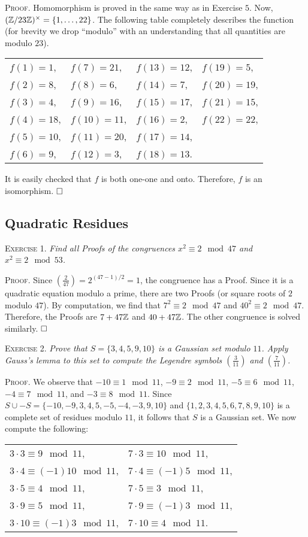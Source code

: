 \documentclass[11pt, leqno]{article}
\newcommand{\done}{\ensuremath{\hfill\square}}
\begin{document}
\textsc{Proof}. Homomorphism is proved in the same way as in Exercise $5$. Now, $(\mathbb{Z}/23\mathbb{Z})^{\times} = \{1, \ldots, 22\}$. The following table completely describes the function (for brevity we drop ``modulo'' with an understanding that all quantities are modulo $23$).
\begin{longtable}{p{6em} p{6em} p{6em} p{6em}}
  $f(1) = 1$, & $f(7) = 21$, & $f(13) = 12$, & $f(19) = 5$,\\
  $f(2) = 8$, & $f(8) = 6$, & $f(14) = 7$, & $f(20) = 19$,\\
  $f(3) = 4$, & $f(9) = 16$, & $f(15) = 17$, & $f(21) = 15$,\\
  $f(4) = 18$, & $f(10) = 11$, & $f(16) = 2$, & $f(22) = 22$,\\
  $f(5) = 10$, & $f(11) = 20$, & $f(17) = 14$, & \\
  $f(6) = 9$, & $f(12) = 3$, & $f(18) = 13$. & 
\end{longtable}
\reduce
It is easily checked that $f$ is both one-one and onto. Therefore, $f$ is an isomorphism. \done

\subsection{Quadratic Residues}

\textsc{Exercise 1}. \emph{Find all Proofs of the congruences $x^2 \equiv 2 \mod 47$ and $x^2 \equiv 2 \mod 53$.}

\textsc{Proof}. Since $\left( \frac{2}{47} \right) = 2^{(47-1)/2} = 1$, the congruence has a Proof. Since it is a quadratic equation modulo a prime, there are two Proofs (or square roots of $2$ modulo $47$). By computation, we find that $7^2 \equiv 2 \mod 47$ and $40^2 \equiv 2 \mod 47$. Therefore, the Proofs are $7+47\mathbb{Z}$ and $40+47\mathbb{Z}$. The other congruence is solved similarly. \done

\textsc{Exercise 2}. \emph{Prove that $S=\{3, 4, 5, 9, 10\}$ is a Gaussian set modulo $11$. Apply Gauss's lemma to this set to compute the Legendre symbols $\left(\frac{3}{11}\right)$ and $\left(\frac{7}{11}\right)$.}

\textsc{Proof}. We observe that $-10 \equiv 1 \mod 11$, $-9 \equiv 2 \mod 11$, $-5 \equiv 6 \mod 11$, $-4 \equiv 7 \mod 11$, and $-3 \equiv 8 \mod 11$. Since $S\cup -S = \{-10, -9, 3, 4, 5, -5, -4, -3, 9, 10\}$ and $\{1, 2, 3, 4, 5, 6, 7, 8, 9, 10\}$ is a complete set of residues modulo $11$, it follows that $S$ is a Gaussian set. We now compute the following:
\begin{longtable}{p{12em} p{12em}}
  $3 \cdot 3 \equiv 9 \mod 11$, & $7 \cdot 3 \equiv 10 \mod 11$,\\
  $3 \cdot 4 \equiv (-1)10 \mod 11$, & $7 \cdot 4 \equiv (-1)5 \mod 11$,\\
  $3 \cdot 5 \equiv 4 \mod 11$, & $7 \cdot 5 \equiv 3 \mod 11$,\\
  $3 \cdot 9 \equiv 5 \mod 11$, & $7 \cdot 9 \equiv (-1)3 \mod 11$,\\
  $3 \cdot 10 \equiv (-1)3 \mod 11$, & $7 \cdot 10 \equiv 4 \mod 11$.\\
\end{longtable}
\reduce
\end{document}
